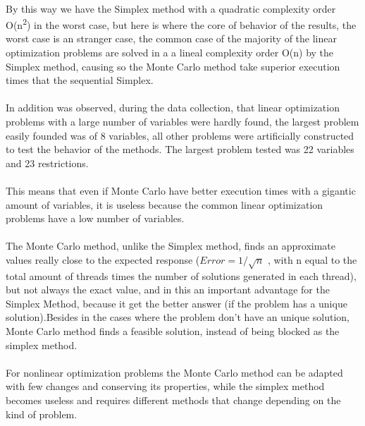 \documentclass[runningheads]{llncs}
\begin{document}
\paragraph{}
By this way we have the Simplex method with a quadratic complexity order O(n\textsuperscript{2}) in the worst case, but here is where the core of behavior of the results, the worst case is an stranger case, the common case of the majority of the linear optimization problems are solved in a a lineal complexity order O(n) by the Simplex method, causing so the Monte Carlo method take superior execution times that the sequential Simplex.

\paragraph{}
In addition was observed, during the data collection, that linear optimization problems with a large number of variables were hardly found, the largest problem easily founded was of 8 variables, all other problems were artificially constructed to test the behavior of the methods. The largest problem tested was 22 variables and 23 restrictions.

\paragraph{}
This means that even if Monte Carlo have better execution times with a gigantic amount of variables, it is useless because the common linear optimization problems have a low number of variables.

\paragraph{}
The Monte Carlo method, unlike the Simplex method, finds an approximate values really close to the expected response ($Error=1/\sqrt{n}$ , with n equal to the total amount of threads times the number of solutions generated in each thread), but not always the exact value, and in this an important advantage for the Simplex Method, because it get the better answer (if the problem has a unique solution).Besides in the cases where the problem don't have an unique solution, Monte Carlo method finds a feasible solution, instead of being blocked as the simplex method.

\paragraph{}
For nonlinear optimization problems the Monte Carlo method can be adapted with few changes and conserving its properties, while the simplex method becomes useless and requires different methods that change depending on the kind of problem.
\end{document}
